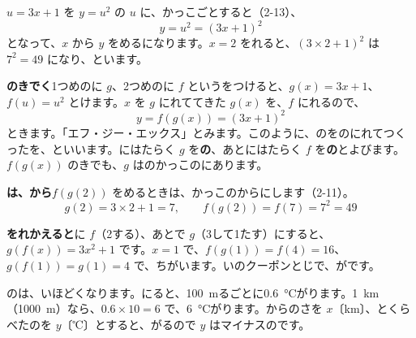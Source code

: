 $u=3x+1$ を $y=u^2$ の $u$ に、かっこごとすると（2-13）、
\[ y=u^2=(3x+1)^2 \]
となって、$x$ から $y$ をめるになります。$x=2$ をれると、$(3\times2+1)^2$ は $7^2=49$ になり、といます。

\textbf{のきでく}\quad 1つめのに $g$、2つめのに $f$ というをつけると、$g(x)=3x+1$、$f(u)=u^2$ とけます。$x$ を $g$ にれててきた $g(x)$ を、$f$ にれるので、
\[ y=f(g(x))=(3x+1)^2 \]
ときます。「エフ・ジー・エックス」とみます。このように、のをのにれてつくったを、\textbf{}といいます。にはたらく $g$ を\textbf{の}、あとにはたらく $f$ を\textbf{の}とよびます。$f(g(x))$ のきでも、$g$ はのかっこのにあります。

\textbf{は、から}\quad $f(g(2))$ をめるときは、かっこのからにします（2-11）。
\[ g(2)=3\times2+1=7,\qquad f(g(2))=f(7)=7^2=49 \]

\textbf{をれかえると}\quad {}に $f$（2する）、あとで $g$（3して1たす）にすると、$g(f(x))=3x^2+1$ です。$x=1$ で、$f(g(1))=f(4)=16$、$g(f(1))=g(1)=4$ で、ちがいます。いのクーポンとじで、がです。


\label{bk:3-3:iroiro}
のは、いほどくなります。にると、\qty{100}{m}るごとに\qty{0.6}{\degreeCelsius}がります。\qty{1}{km}（\qty{1000}{m}）なら、$0.6\times10=6$ で、\qty{6}{\degreeCelsius}がります。からのさを $x$〔km〕、とくらべたのを $y$〔℃〕とすると、がるので $y$ はマイナスのです。

